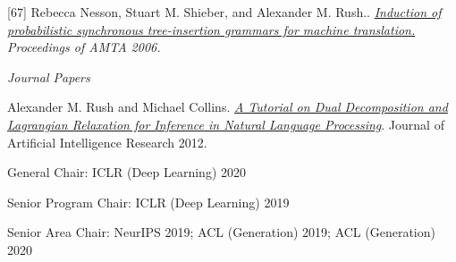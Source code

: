 \documentclass[10pt]{article}
\begin{document}
[67] \ind Rebecca Nesson, Stuart M. Shieber, and Alexander M. Rush.. \emph{\href{ http://www.eecs.harvard.edu/~shieber/Biblio/Papers/Nesson-2006-IPS.pdf }{ Induction of probabilistic synchronous tree-insertion grammars for machine translation.} }\emph{ Proceedings of AMTA 2006. }


\vspace{0.3in}

\noindent\emph{Journal Papers \vspace{0.01in}}

\ind Alexander M. Rush and Michael Collins. \emph{\href{http://www.cs.columbia.edu/~mcollins/acltutorial.pdf}{A Tutorial on Dual Decomposition and Lagrangian Relaxation for Inference in Natural Language Processing}}. Journal of Artificial Intelligence Research 2012.









\medskip


\bigskip

\ind General  Chair:
\ind ICLR (Deep Learning) 2020

\ind Senior Program Chair:
\ind ICLR (Deep Learning) 2019

\ind Senior Area Chair:
\ind NeurIPS 2019; ACL (Generation) 2019; ACL (Generation) 2020
\end{document}
